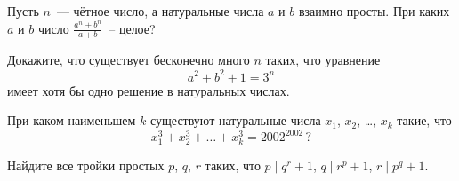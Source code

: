 


\begin{problems}

\item
Пусть $n$~--- чётное число, а натуральные числа $a$ и $b$ взаимно просты.
При каких $a$ и $b$ число $\frac{a^{n} + b^{n}}{a + b}$~-- целое?

\item
Докажите, что существует бесконечно много $n$ таких, что уравнение
\[ a^2 + b^2 + 1 = 3^{n} \]
имеет хотя бы одно решение в натуральных числах.

\item
При каком наименьшем $k$ существуют натуральные числа
$x_{1}$, $x_{2}$, \ldots, $x_{k}$ такие, что
\[
    x_{1}^3 + x_{2}^3 + \ldots + x_{k}^3 = 2002^{2002}
\, ? \]

\item
Найдите все тройки простых $p$, $q$, $r$ таких, что
$p \mid q^{r} + 1$,\enspace
$q \mid r^{p} + 1$,\enspace
$r \mid p^{q} + 1$.

\end{problems}

